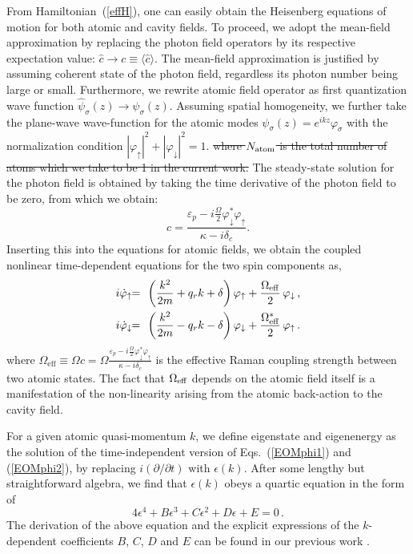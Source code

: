 \documentclass[atoms,article,submit,moreauthors,dvi2pdf,12pt,a4paper]{mdpi}
\def\ba{\begin{eqnarray}}
\def\ea{\end{eqnarray}}
\begin{document}
From Hamiltonian~(\ref{effH}), one can easily obtain the Heisenberg equations of motion for both atomic and cavity fields. {\color{red} To proceed, we adopt the mean-field approximation by replacing the photon field operators by its respective expectation value: $\hat{c} \rightarrow c\equiv \langle \hat{c} \rangle$. The mean-field approximation is justified by assuming coherent state of the photon field, regardless its photon number being large or small. Furthermore, we rewrite atomic field operator as first quantization wave function  $ \hat{\psi}_\sigma ({z}) \rightarrow  \psi_\sigma (z)
$.}
Assuming spatial homogeneity, we further take the plane-wave wave-function for the atomic modes $\psi_\sigma({z})=e^{i{k} {z}}\varphi_\sigma$ with the normalization condition $|\varphi_\uparrow|^2+|\varphi_\downarrow|^2=1$. {\color{red} \sout{where $N_{\rm atom}$ is the total number of atoms which we take to be 1 in the current work.}} The steady-state solution for the photon field is obtained by taking the time derivative of the photon field to be zero, from which we obtain:
\begin{equation}
c = \frac{\varepsilon_{p}-i\frac{\Omega}{2} \varphi_\downarrow^\ast\varphi_\uparrow}{\kappa-i\delta_{c}}.
\label{c}
\end{equation}
Inserting this into the equations for atomic fields, we obtain the coupled nonlinear time-dependent equations for the two spin components as,
\ba
i\dot{\varphi}_{\uparrow}&\!\! =\!\! & \left(\frac{{k}^{2}}{2m}+q_{r}k+\delta\right) \varphi_{\uparrow}+ \frac{\Omega_{\rm eff}}{2}\, \varphi_{\downarrow} \,,\label{EOMphi1}\\
i\dot{\varphi}_{\downarrow} & \!\!= \!\!& \left(\frac{{k}^{2}}{2m}-q_{r}k-\delta\right)\varphi_{\downarrow}+ \frac{\Omega^*_{\rm eff}}{2}\,\varphi_{\uparrow}\,.\label{EOMphi2}
\ea
where $\Omega_\text{eff} \equiv {\Omega} c ={\Omega} \frac{\varepsilon_{p}-i\frac{\Omega}{2} \varphi_\downarrow^\ast\varphi_\uparrow}{\kappa-i\delta_{c}} $ is the effective Raman coupling strength between two atomic states. The fact that $\Omega_{\rm eff}$ depends on the atomic field itself is a manifestation of the non-linearity arising from the atomic back-action to the cavity field.

For a given atomic quasi-momentum ${k}$, we define eigenstate and eigenenergy as the solution of the time-independent version of Eqs.~(\ref{EOMphi1}) and (\ref{EOMphi2}), by replacing $i(\partial/\partial t)$ with $\epsilon({k})$. After some lengthy but straightforward algebra, we find that $\epsilon({ k})$ obeys a quartic equation in the form of
\begin{equation}
4\epsilon^4+B\epsilon^3+C\epsilon^2+D\epsilon+E=0 \,.
\label{generalquarticEq}
\end{equation}
The derivation of the above equation and the explicit expressions of the $k$-dependent coefficients $B$, $C$, $D$ and $E$ can be found in our previous work \cite{cavitySOC}.
\end{document}
